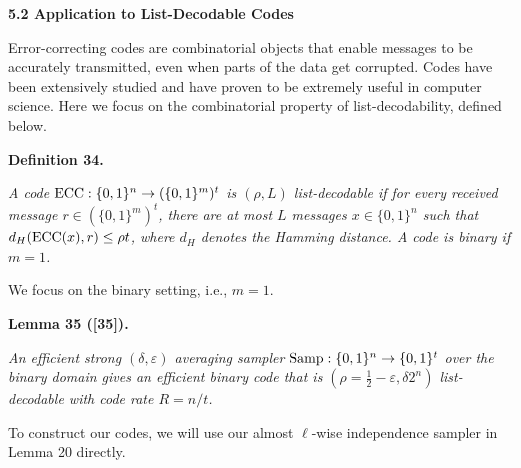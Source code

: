 \par\medskip\noindent\textbf{
5.2 Application to List-Decodable Codes}\par




Error-correcting codes are combinatorial objects that enable messages to be accurately transmitted, even when parts of the data get corrupted. Codes have been extensively studied and have proven to be extremely useful in computer science. Here we focus on the combinatorial property of list-decodability, defined below.\par





\par\medskip\noindent\textbf{
\textbf{Definition 34}\textbf{.}
}\par



\emph{A code ${\textup{{ECC}}}:\{0,1\}^{n}\rightarrow({\{0,1\}^{m}})^{t}$ is $(\rho,L)$ list-decodable if for every received message $r\in(\{0,1\}^{m})^{t}$, there are at most $L$ messages $x\in\{0,1\}^{n}$ such that $d_{H}({\textup{{ECC}}}(x),r)\leq\rho t$, where $d_{H}$ denotes the Hamming distance. A code is binary if $m=1$.}\par






We focus on the binary setting, i.e., $m=1$.\par





\par\medskip\noindent\textbf{
\textbf{Lemma 35}\textbf{ }([35])\textbf{.}
}\par



\emph{An efficient strong $(\delta,\varepsilon)$ averaging sampler $\textup{{Samp}}:\{0,1\}^{n}\to\{0,1\}^{t}$ over the binary domain gives an efficient binary code that is $(\rho=\frac{1}{2}-\varepsilon,\delta 2^{n})$ list-decodable with code rate $R=n/t$.}\par






To construct our codes, we will use our almost $\ell$-wise independence sampler in Lemma 20 directly.\par




